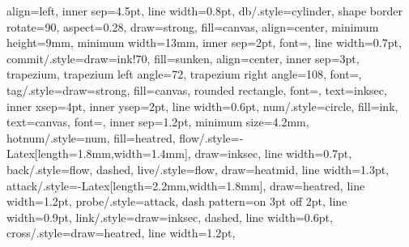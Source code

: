 {{    align=left, inner sep=4.5pt, line width=0.8pt},
  db/.style={cylinder, shape border rotate=90, aspect=0.28, draw=strong,
    fill=canvas, align=center, minimum height=9mm, minimum width=13mm,
    inner sep=2pt, font=\footnotesize, line width=0.7pt},
  commit/.style={draw=ink!70, fill=sunken, align=center, inner sep=3pt,
    trapezium, trapezium left angle=72, trapezium right angle=108,
    font=\footnotesize},
  tag/.style={draw=strong, fill=canvas, rounded rectangle,
    font=\ttfamily\scriptsize, text=inksec, inner xsep=4pt,
    inner ysep=2pt, line width=0.6pt},
  num/.style={circle, fill=ink, text=canvas, font=\semibold\scriptsize,
    inner sep=1.2pt, minimum size=4.2mm},
  hotnum/.style={num, fill=heatred},
  flow/.style={-{Latex[length=1.8mm,width=1.4mm]}, draw=inksec,
    line width=0.7pt},
  back/.style={flow, dashed},
  live/.style={flow, draw=heatmid, line width=1.3pt},
  attack/.style={-{Latex[length=2.2mm,width=1.8mm]}, draw=heatred,
    line width=1.2pt},
  probe/.style={attack, dash pattern=on 3pt off 2pt, line width=0.9pt},
  link/.style={draw=inksec, dashed, line width=0.6pt},
  cross/.style={draw=heatred, line width=1.2pt},
}

\newcommand{\cardstep}{0.38}
\newcommand{\cardstack}[4]{%
  \foreach \lab/\k in {#4} {
    \draw[#1] ($(#2)+(\k*\cardstep,\k*\cardstep)$) rectangle
      ($(#3)+(\k*\cardstep,\k*\cardstep)$);
    \node[cardlabel, anchor=north east] at
      ($(#3)+(\k*\cardstep-0.2,\k*\cardstep-0.04)$) {\lab};
  }
  \draw[#1] (#2) rectangle (#3);}

\newcommand{\barred}[1]{%
  \draw[cross] (#1.south west) -- (#1.north east);
  \draw[cross] (#1.north west) -- (#1.south east);}
